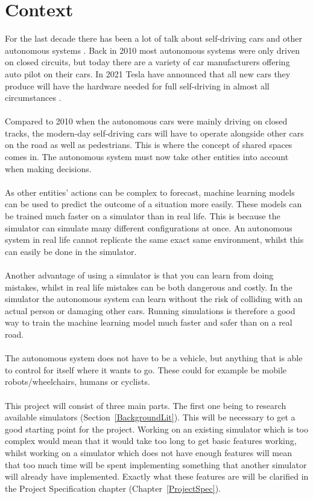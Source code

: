 \section{Context}
For the last decade there has been a lot of talk about self-driving cars and other autonomous systems \cite{markoff_2010}. Back in 2010 most autonomous systems were only driven on closed circuits, but today there are a variety of car manufacturers offering auto pilot on their cars. In 2021 Tesla have announced that all new cars they produce will have the hardware needed for full self-driving in almost all circumstances \cite{teslaSelf}. 
\\~\\ 
Compared to 2010 when the autonomous cars were mainly driving on closed tracks, the modern-day self-driving cars will have to operate alongside other cars on the road as well as pedestrians.  This is where the concept of shared spaces comes in. The autonomous system must now take other entities into account when making decisions. 
\\~\\ 
As other entities’ actions can be complex to forecast, machine learning models can be used to predict the outcome of a situation more easily. These models can be trained much faster on a simulator than in real life. This is because the simulator can simulate many different configurations at once. An autonomous system in real life cannot replicate the same exact same environment, whilst this can easily be done in the simulator.  
\\~\\ 
Another advantage of using a simulator is that you can learn from doing mistakes, whilst in real life mistakes can be both dangerous and costly. In the simulator the autonomous system can learn without the risk of colliding with an actual person or damaging other cars. Running simulations is therefore a good way to train the machine learning model much faster and safer than on a real road.  
\\~\\ 
The autonomous system does not have to be a vehicle, but anything that is able to control for itself where it wants to go. These could for example be mobile robots/wheelchairs, humans or cyclists. 
\\~\\ 
This project will consist of three main parts. The first one being to research available simulators (Section~\ref{BackgroundLit}). This will be necessary to get a good starting point for the project. Working on an existing simulator which is too complex would mean that it would take too long to get basic features working, whilst working on a simulator which does not have enough features will mean that too much time will be spent implementing something that another simulator will already have implemented. Exactly what these features are will be clarified in the Project Specification chapter (Chapter~\ref{ProjectSpec}). 
